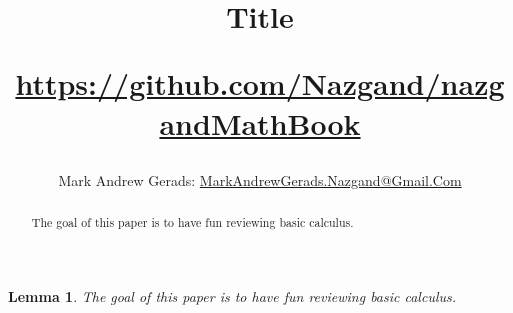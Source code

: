 \documentclass[]{article}
\author{Mark Andrew Gerads: \href{MailTo:MarkAndrewGerads.Nazgand@Gmail.Com}{MarkAndrewGerads.Nazgand@Gmail.Com}}
\title{
	Title
	
	\href{https://github.com/Nazgand/nazgandMathBook}{https://github.com/Nazgand/nazgandMathBook}
}
\newtheorem{lemma}[theorem]{Lemma}
\numberwithin{equation}{section}
\begin{document}
	
	\maketitle
	
	\begin{abstract}
		The goal of this paper is to have fun reviewing basic calculus.
	\end{abstract}
	
	
	\begin{lemma}
		The goal of this paper is to have fun reviewing basic calculus.
	\end{lemma}
\end{document}
